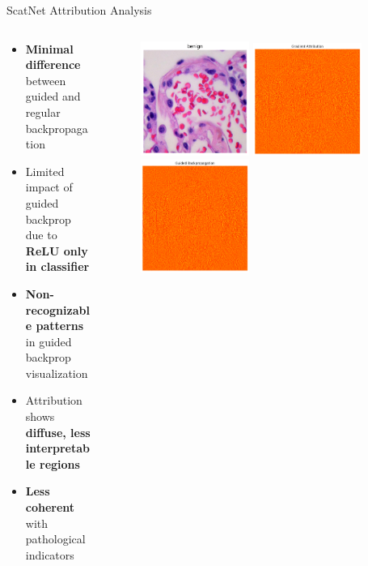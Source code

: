 \documentclass[aspectratio=169,8pt]{beamer}  %
\begin{document}
\begin{frame}{ScatNet Attribution Analysis}
\begin{columns}[T]
\begin{column}{0.5\textwidth}
\begin{itemize}
\item \textbf{Minimal difference} between guided and regular backpropagation
\item Limited impact of guided backprop due to \textbf{ReLU only in classifier}
\item \textbf{Non-recognizable patterns} in guided backprop visualization
\item Attribution shows \textbf{diffuse, less interpretable regions}
\item \textbf{Less coherent} with pathological indicators
\end{itemize}
\end{column}
\begin{column}{0.5\textwidth}
\begin{figure}
\includegraphics[width=0.45\textwidth]{imgs/normal_image.png}
\vspace{0.2cm}
\includegraphics[width=0.45\textwidth]{imgs/scatnet_bp.png}
\vspace{0.2cm}
\includegraphics[width=0.45\textwidth]{imgs/scatnet_gbp.png}

\end{figure}
\end{column}
\end{columns}
\end{frame}
\end{document}
